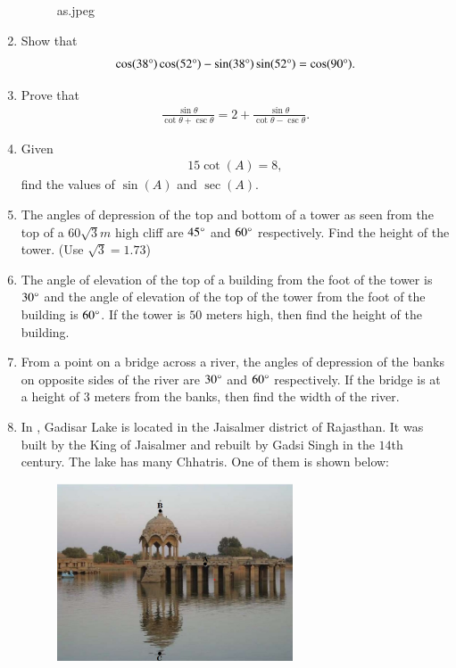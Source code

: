 \begin{enumerate}
\begin{figure}[H]
        \caption{as.jpeg}
        \label{fig:as.jpeg}
    \end{figure}
    \hfill{}\item Show that 
    \begin{align}
        \cos(38\degree) \cos(52\degree) - \sin(38\degree)\sin(52\degree) = \cos(90\degree).
    \end{align}
    \hfill{}\item Prove that 
    \begin{align}
        \frac{\sin\theta}{\cot\theta+\csc\theta} = 2+\frac{\sin\theta}{\cot\theta-\csc\theta}.
    \end{align}
    \hfill{}\item Given 
    \begin{align}
        15 \cot (A) = 8,
    \end{align}
    find the values of $\sin (A)$ and $\sec (A)$.
    \hfill{}\item The angles of depression of the top and bottom of a tower as seen from the top of a $60\sqrt{3}m$ high cliff are $45\degree$ and $60\degree$ respectively. Find the height of the tower. (Use $\sqrt{3}=1.73$)
    \hfill{}\item The angle of elevation of the top of a building from the foot of the tower is $30\degree$ and the angle of elevation of the top of the tower from the foot of the building is $60\degree$. If the tower is $50$ meters high, then find the height of the building.
    \hfill{}\item From a point on a bridge across a river, the angles of depression of the banks on opposite sides of the river are $30\degree$ and $60\degree$ respectively. If the bridge is at a height of $3$ meters from the banks, then find the width of the river. 
    \hfill{}\item In , Gadisar Lake is located in the Jaisalmer district of Rajasthan. It was built by the King of Jaisalmer and rebuilt by Gadsi Singh in the $14$th century. The lake has many Chhatris. One of them is shown below:
    \begin{figure}[H]
        \centering
    	 \includegraphics[width=70mm]{cbse-math/figs/ak.jpeg}

\end{figure}
\end{enumerate}
